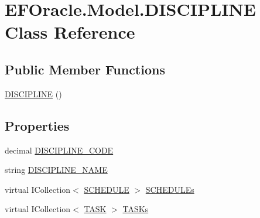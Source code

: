 \hypertarget{class_e_f_oracle_1_1_model_1_1_d_i_s_c_i_p_l_i_n_e}{}\section{E\+F\+Oracle.\+Model.\+D\+I\+S\+C\+I\+P\+L\+I\+NE Class Reference}
\label{class_e_f_oracle_1_1_model_1_1_d_i_s_c_i_p_l_i_n_e}
\subsection*{Public Member Functions}
\begin{DoxyCompactItemize}
\item 
\hyperlink{class_e_f_oracle_1_1_model_1_1_d_i_s_c_i_p_l_i_n_e_a7f1ccbe060471815839f602478f1d57b}{D\+I\+S\+C\+I\+P\+L\+I\+NE} ()
\end{DoxyCompactItemize}
\subsection*{Properties}
\begin{DoxyCompactItemize}
\item 
decimal \hyperlink{class_e_f_oracle_1_1_model_1_1_d_i_s_c_i_p_l_i_n_e_a567e03fdacbb6759c4c992661afebe35}{D\+I\+S\+C\+I\+P\+L\+I\+N\+E\+\_\+\+C\+O\+DE}
\item 
string \hyperlink{class_e_f_oracle_1_1_model_1_1_d_i_s_c_i_p_l_i_n_e_a835096386d3c0f75cf242b1db2b6853b}{D\+I\+S\+C\+I\+P\+L\+I\+N\+E\+\_\+\+N\+A\+ME}
\item 
virtual I\+Collection$<$ \hyperlink{class_e_f_oracle_1_1_model_1_1_s_c_h_e_d_u_l_e}{S\+C\+H\+E\+D\+U\+LE} $>$ \hyperlink{class_e_f_oracle_1_1_model_1_1_d_i_s_c_i_p_l_i_n_e_a88721dfdf505cfc7542013244720d12e}{S\+C\+H\+E\+D\+U\+L\+Es}
\item 
virtual I\+Collection$<$ \hyperlink{class_e_f_oracle_1_1_model_1_1_t_a_s_k}{T\+A\+SK} $>$ \hyperlink{class_e_f_oracle_1_1_model_1_1_d_i_s_c_i_p_l_i_n_e_a729b4773e3441b7f9eb4cc65f74353ba}{T\+A\+S\+Ks}
\end{DoxyCompactItemize}


